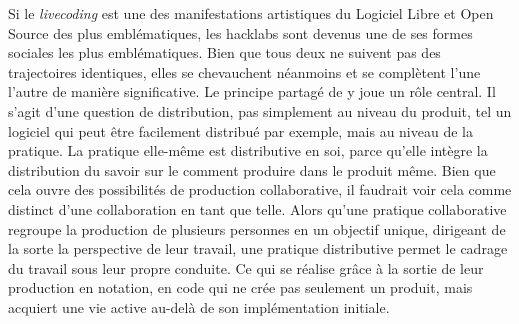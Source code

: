{Si le {\em livecoding} est une des manifestations artistiques du
Logiciel Libre et Open Source des plus embl\'ematiques, les hacklabs
sont devenus une de ses formes sociales les plus embl\'ematiques. Bien
que tous deux ne suivent pas des trajectoires identiques, elles se
chevauchent n\'eanmoins et se compl\`etent l'une l'autre de mani\`ere
significative. Le principe partag\'e de  y joue un r\^ole central. Il s'agit d'une question de
distribution, pas simplement au niveau du produit, tel un logiciel qui
peut \^etre facilement distribu\'e par exemple, mais au niveau de la
pratique. La pratique elle{}-m\^eme est distributive en soi, parce
qu'elle int\`egre la distribution du savoir sur le comment produire
dans le produit m\^eme. Bien que cela ouvre des possibilit\'es de
production collaborative, il faudrait voir cela comme distinct d'une
collaboration en tant que telle. Alors qu'une pratique collaborative
regroupe la production de plusieurs personnes en un objectif unique,
dirigeant de la sorte la perspective de leur travail, une pratique
distributive permet le cadrage du travail sous leur propre conduite. Ce
qui se r\'ealise gr\^ace \`a la sortie de leur production en notation,
en code qui ne cr\'ee pas seulement un produit, mais acquiert une vie
active au{}-del\`a de son impl\'ementation initiale.


}
